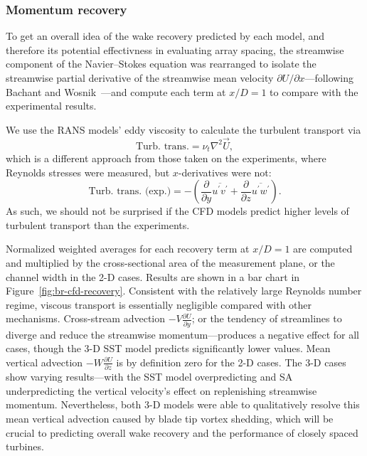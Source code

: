 \documentclass[aip,graphicx]{revtex4-1}
\begin{document}
\subsubsection{Momentum recovery}

To get an overall idea of the wake recovery predicted by each model, and
therefore its potential effectivness in evaluating array spacing, the streamwise
component of the Navier--Stokes equation was rearranged to isolate the
streamwise partial derivative of the streamwise mean velocity $\partial U /
\partial x$---following Bachant and Wosnik~\cite{Bachant2015-JoT}---and compute
each term at $x/D = 1$ to compare with the experimental results.

We use the RANS models' eddy viscosity to calculate the turbulent transport via
\begin{equation}
    \text{Turb. trans.} = \nu_t \nabla^2 \vec{U},
    \label{eq:turb-trans}
\end{equation}
which is a different approach from those taken on the experiments, where
Reynolds stresses were measured, but $x$-derivatives were not:
\begin{equation}
    \text{Turb. trans. (exp.)} =
    -\left(
    \frac{\partial}{\partial y} \overline{u^\prime v^\prime}
    +
    \frac{\partial}{\partial z} \overline{u^\prime w^\prime}
    \right).
\end{equation}
As such, we should not be surprised if the CFD models predict higher levels of
turbulent transport than the experiments.

Normalized weighted averages for each recovery term at $x/D=1$ are computed and
multiplied by the cross-sectional area of the measurement plane, or the channel
width in the 2-D cases. Results are shown in a bar chart in
Figure~\ref{fig:br-cfd-recovery}. Consistent with the relatively large Reynolds
number regime, viscous transport is essentially negligible compared with other
mechanisms. Cross-stream advection $-V \frac{\partial U}{\partial y}$; or the
tendency of streamlines to diverge and reduce the streamwise momentum---produces
a negative effect for all cases, though the 3-D SST model predicts significantly
lower values. Mean vertical advection $-W \frac{\partial U}{\partial z}$ is by
definition zero for the 2-D cases. The 3-D cases show varying results---with the
SST model overpredicting and SA underpredicting the vertical velocity's effect
on replenishing streamwise momentum. Nevertheless, both 3-D models were able to
qualitatively resolve this mean vertical advection caused by blade tip vortex
shedding, which will be crucial to predicting overall wake recovery and the
performance of closely spaced turbines.
\end{document}
